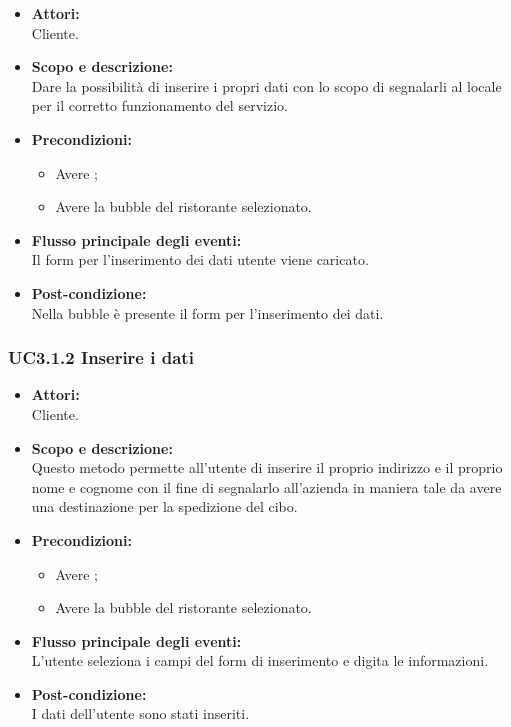 \begin{itemize}
	\item \textbf{Attori:}
	\\Cliente.
	\item \textbf{Scopo e descrizione:} 
	\\Dare la possibilità di inserire i propri dati con lo scopo di segnalarli al locale per il corretto funzionamento del servizio.
	\item \textbf{Precondizioni:}
	\begin{itemize}
		\item Avere ;
		\item Avere la bubble del ristorante selezionato.
	\end{itemize}
	\item \textbf{Flusso principale degli eventi:}
	\\Il form per l’inserimento dei dati utente viene caricato.
	\item \textbf{Post-condizione:}
	\\Nella bubble è presente il form per l'inserimento dei dati.
\end{itemize}

\subsubsection{UC3.1.2 Inserire i dati} \label{UC3.1.2}

\begin{itemize}
	\item \textbf{Attori:}
	\\Cliente.
	\item \textbf{Scopo e descrizione:} 
	\\Questo metodo permette all’utente di inserire il proprio indirizzo e il proprio nome e cognome con il fine di segnalarlo all’azienda in maniera tale da avere una destinazione per la spedizione del cibo.
	\item \textbf{Precondizioni:}
	\begin{itemize}
		\item Avere ;
		\item Avere la bubble del ristorante selezionato.
	\end{itemize}
	\item \textbf{Flusso principale degli eventi:}
	\\L'utente seleziona i campi del form di inserimento e digita le informazioni.
	\item \textbf{Post-condizione:}
	\\I dati dell’utente sono stati inseriti.
\end{itemize}

